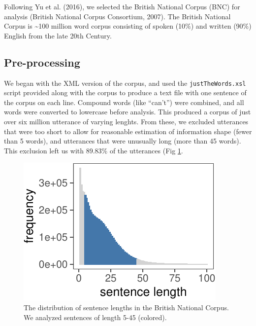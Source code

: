 \documentclass[10pt, letterpaper]{article}
\newenvironment{CodeChunk}{}{}
\begin{document}
Following Yu et al. (2016), we selected the British National Corpus
(BNC) for analysis (British National Corpus Consortium, 2007). The
British National Corpus is \textasciitilde{}100 million word corpus
consisting of spoken (10\%) and written (90\%) English from the late
20th Century.

\hypertarget{pre-processing}{%
\subsection{Pre-processing}\label{pre-processing}}

We began with the XML version of the corpus, and used the
\texttt{justTheWords.xsl} script provided along with the corpus to
produce a text file with one sentence of the corpus on each line.
Compound words (like ``can't'') were combined, and all words were
converted to lowercase before analysis. This produced a corpus of just
over six million utterance of varying lenghts. From these, we excluded
utterances that were too short to allow for reasonable estimation of
information shape (fewer than 5 words), and utterances that were
unusually long (more than 45 words). This exclusion left us with 89.83\%
of the utterances (Fig \ref{fig:bnc-lengths}.

\begin{CodeChunk}
\begin{figure}[tb]

{\centering \includegraphics{figs/bnc-lengths-1} 

}

\caption[The distribution of sentence lengths in the British National Corpus]{The distribution of sentence lengths in the British National Corpus. We analyzed sentences of length 5-45 (colored).}\label{fig:bnc-lengths}
\end{figure}
\end{CodeChunk}
\end{document}
